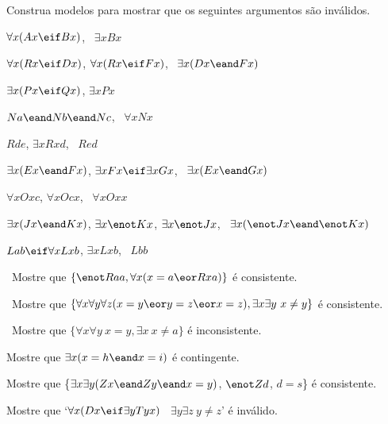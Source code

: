 \problempart
Construa modelos para mostrar que os seguintes argumentos são inválidos.
\begin{earg}
\item $\forall x(Ax \eif Bx)$, \therefore\ $\exists x Bx$
\item $\forall x(Rx \eif Dx)$, $\forall x(Rx \eif Fx)$, \therefore\ $\exists x(Dx \eand Fx)$
\item $\exists x(Px\eif Qx)$, \therefore $\exists x Px$
\item $Na \eand Nb \eand Nc$, \therefore\ $\forall x Nx$
\item $Rde$, $\exists x Rxd$, \therefore\ $Red$
\item $\exists x(Ex \eand Fx)$, $\exists x Fx \eif \exists x Gx$, \therefore\ $\exists x(Ex \eand Gx)$
\item $\forall x Oxc$, $\forall x Ocx$, \therefore\ $\forall x Oxx$
\item $\exists x(Jx \eand Kx)$, $\exists x \enot Kx$, $\exists x \enot Jx$, \therefore\ $\exists x(\enot Jx \eand \enot Kx)$
\item $Lab \eif \forall x Lxb$, $\exists x Lxb$, \therefore\ $Lbb$
\end{earg}

\problempart
\label{pr.IdentityModels}
\begin{earg}
\item\leftsolutions\ Mostre que $\{{\enot}Raa, \forall x (x=a \eor Rxa)\}$
é consistente.
\item\leftsolutions\ Mostre que $\{\forall x\forall y\forall z(x=y \eor y=z \eor x=z),
\exists x\exists y\ x\neq y\}$ é consistente.
\item\leftsolutions\ Mostre que $\{\forall x\forall y\ x=y, \exists x\ x \neq a\}$ é inconsistente.
\item Mostre que $\exists x (x = h \eand x = i)$ é contingente.
\item Mostre que \{$\exists x\exists y(Zx \eand Zy \eand x=y)$, $\enot Zd$, $d=s$\} é consistente.
\item Mostre que `$\forall x(Dx \eif \exists y Tyx)$ \therefore\ $\exists y \exists z\ y\neq z$' é inválido.
\end{earg}


